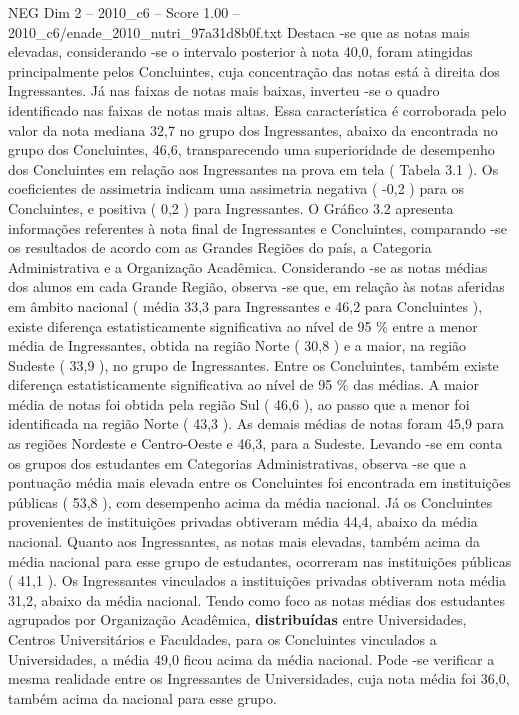 \begin{textsample}{NEG Dim 2 – 2010\_c6 – Score 1.00 – 2010\_c6/enade\_2010\_nutri\_97a31d8b0f.txt}
Destaca -se que as notas mais elevadas, considerando -se o intervalo posterior à nota 40,0, foram atingidas principalmente pelos Concluintes, cuja concentração das notas está à direita dos Ingressantes.
Já nas faixas de notas mais baixas, inverteu -se o quadro identificado nas faixas de notas mais altas.
Essa característica é corroborada pelo valor da nota mediana 32,7 no grupo dos Ingressantes, abaixo da encontrada no grupo dos Concluintes, 46,6, transparecendo uma superioridade de desempenho dos Concluintes em relação aos Ingressantes na prova em tela ( Tabela 3.1 ).
Os coeficientes de assimetria indicam uma assimetria negativa ( -0,2 ) para os Concluintes, e positiva ( 0,2 ) para Ingressantes.
O Gráfico 3.2 apresenta informações referentes à nota final de Ingressantes e Concluintes, comparando -se os resultados de acordo com as Grandes Regiões do país, a Categoria Administrativa e a Organização Acadêmica.
Considerando -se as notas médias dos alunos em cada Grande Região, observa -se que, em relação às notas aferidas em âmbito nacional ( média 33,3 para Ingressantes e 46,2 para Concluintes ), existe diferença estatisticamente significativa ao nível de 95 \% entre a menor média de Ingressantes, obtida na região Norte ( 30,8 ) e a maior, na região Sudeste ( 33,9 ), no grupo de Ingressantes.
Entre os Concluintes, também existe diferença estatisticamente significativa ao nível de 95 \% das médias.
A maior média de notas foi obtida pela região Sul ( 46,6 ), ao passo que a menor foi identificada na região Norte ( 43,3 ).
As demais médias de notas foram 45,9 para as regiões Nordeste e Centro-Oeste e 46,3, para a Sudeste.
Levando -se em conta os grupos dos estudantes em Categorias Administrativas, observa -se que a pontuação média mais elevada entre os Concluintes foi encontrada em instituições públicas ( 53,8 ), com desempenho acima da média nacional.
Já os Concluintes provenientes de instituições privadas obtiveram média 44,4, abaixo da média nacional.
Quanto aos Ingressantes, as notas mais elevadas, também acima da média nacional para esse grupo de estudantes, ocorreram nas instituições públicas ( 41,1 ).
Os Ingressantes vinculados a instituições privadas obtiveram nota média 31,2, abaixo da média nacional.
Tendo como foco as notas médias dos estudantes agrupados por Organização Acadêmica, \textbf{distribuídas} entre Universidades, Centros Universitários e Faculdades, para os Concluintes vinculados a Universidades, a média 49,0 ficou acima da média nacional.
Pode -se verificar a mesma realidade entre os Ingressantes de Universidades, cuja nota média foi 36,0, também acima da nacional para esse grupo.

\end{textsample}
